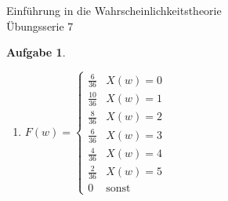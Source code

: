 \documentclass[11pt]{article}
\theoremstyle{break}
\newtheorem{task}{Aufgabe}
\begin{document}
\begin{center}
\Large{Einführung in die Wahrscheinlichkeitstheorie}\\
\large{Übungsserie 7}
\end{center}
\setcounter{task}{1}
\begin{task}
    \hfill\vspace{-5mm}
    \begin{enumerate}[label={(\alph*)}]
        \item $F(w) = \begin{cases}
            \frac{6}{36} & X(w) = 0\\
            \frac{10}{36} & X(w) = 1\\
            \frac{8}{36} & X(w) = 2\\
            \frac{6}{36} & X(w) = 3\\
            \frac{4}{36} & X(w) = 4\\
            \frac{2}{36} & X(w) = 5\\
            0 & \text{sonst}
        \end{cases}$
    \end{enumerate}
\end{task}
\end{document}
